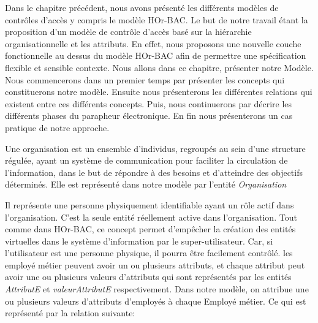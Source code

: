 \label{chapAHOr-BAC}


\label{sectionIntroduction}

Dans le chapitre précédent, nous avons présenté les différents modèles de contrôles d'accès y compris le modèle HOr-BAC. Le but de notre travail étant la proposition d'un modèle de contrôle d'accès basé sur la hiérarchie organisationnelle et les attributs. En effet, nous proposons une nouvelle couche fonctionnelle au dessus du modèle HOr-BAC afin de permettre une spécification flexible et sensible contexte. Nous allons dans ce chapitre, présenter notre Modèle. Nous commencerons dans un premier temps par présenter les concepts qui constituerons notre modèle. Ensuite nous présenterons les différentes relations qui existent entre ces différents concepts. Puis, nous continuerons par décrire les différents phases du parapheur électronique. En fin nous présenterons un cas pratique de notre approche.

\label{sectionConcept}

\label{sectionOrganisation} 
Une organisation est un ensemble d'individus, regroupés au sein d'une structure régulée, ayant un système de communication pour faciliter la circulation de l'information, dans le but de répondre à des besoins et d'atteindre des objectifs déterminés. Elle est représenté dans notre modèle par l'entité \textit{Organisation}

\label{sectionEmployeMetier} 
Il représente une personne physiquement identifiable ayant un rôle actif dans l'organisation. C'est la seule entité réellement active dans l'organisation. Tout comme dans HOr-BAC, ce concept permet d'empêcher la création des entités virtuelles dans le système d'information par le super-utilisateur. Car, si l'utilisateur est une personne physique, il pourra être facilement contrôlé. les employé métier peuvent avoir un ou plusieurs attributs, et chaque attribut peut avoir une ou plusieurs valeurs d'attributs qui sont représentés par les entités \textit{AttributE} et \textit{valeurAttributE} respectivement. Dans notre modèle, on attribue une ou plusieurs valeurs d'attributs d'employés à chaque Employé métier. Ce qui est représenté par la relation suivante: %

